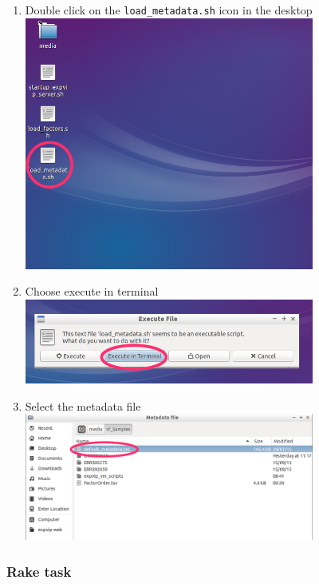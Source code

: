 \begin{enumerate}
\def\labelenumi{\arabic{enumi}.}
\itemsep1pt\parskip0pt
\item
  Double click on the \lstinline!load_metadata.sh! icon in the desktop
  \\ \includegraphics[width=0.75\textwidth]{expVIP/tutorial/images/LoadMetadata01.png}
\item
  Choose execute in terminal \\ \includegraphics[width=0.75\textwidth]{expVIP/tutorial/images/LoadMetadata02.png}
\item
  Select the metadata file \\ \includegraphics[width=0.75\textwidth]{expVIP/tutorial/images/LoadMetadata03.png}
\end{enumerate}

\subsubsection{Rake task}\label{rake-task-1}

